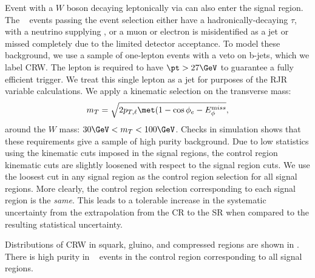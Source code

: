Event with a $W$ boson decaying leptonically via \wln can also enter the signal region.
The \wjets~ events passing the event selection either have a hadronically-decaying $\tau$, with a neutrino supplying \met, or a muon or electron is misidentified as a jet or missed completely due to the limited detector acceptance.
To model these background, we use a sample of one-lepton events with a veto on b-jets, which we label CRW.
The lepton is required to have $\pt > 27 \GeV$ to guarantee a fully efficient trigger.
We treat this single lepton as a jet for purposes of the RJR variable calculations.
We apply a kinematic selection on the transverse mass:
\begin{align}
m_T = \sqrt{2p_{T,\ell} \met ( 1 - \cos{ \phi_{e} - \metphi } },
\end{align}
around the $W$ mass: $30 \GeV < m_T < 100 \GeV$.
Checks in simulation shows that these requirements give a sample of high purity \wln background.
Due to low statistics using the kinematic cuts imposed in the signal regions, the control region kinematic cuts are slightly loosened with respect to the signal region cuts.
We use the loosest cut in any signal region as the control region selection for all signal regions.
More clearly, the control region selection corresponding to each signal region is the \textit{same}.
This leads to a tolerable increase in the systematic uncertainty from the extrapolation from the CR to the SR when compared to the resulting statistical uncertainty.

Distributions of CRW in squark, gluino, and compressed regions are shown in .
There is high purity in \wjets~ events in the control region corresponding to all signal regions.

